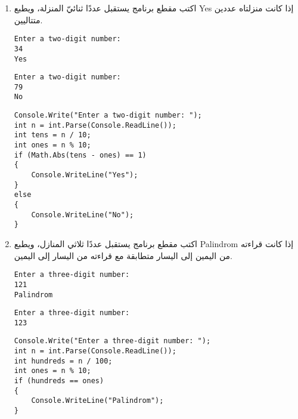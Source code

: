 ﻿\documentclass[12pt]{article}
\begin{document}
\begin{enumerate}[itemsep=3em]
\item
اكتب مقطع برنامج يستقبل عددًا ثنائيّ المنزلة، ويطبع \textenglish{Yes} إذا كانت منزلتاه عددين متتاليين.
\ifdetailed
\begin{boxExample}[1]
\begin{english}
\begin{verbatim}
Enter a two-digit number:
34
Yes
\end{verbatim}
\end{english}
\end{boxExample}
\begin{boxExample}[2]
\begin{english}
\begin{verbatim}
Enter a two-digit number:
79
No
\end{verbatim}
\end{english}
\end{boxExample}
\ifwithsols
\begin{boxSolution}
\begin{english}
\begin{verbatim}
Console.Write("Enter a two-digit number: ");
int n = int.Parse(Console.ReadLine());
int tens = n / 10;
int ones = n % 10;
if (Math.Abs(tens - ones) == 1)
{
    Console.WriteLine("Yes");
}
else
{
    Console.WriteLine("No");
}
\end{verbatim}
\end{english}
\end{boxSolution}
\fi
\clearpage
\fi

\item
اكتب مقطع برنامج يستقبل عددًا ثلاثي المنازل، ويطبع \textenglish{Palindrom} إذا كانت قراءته من اليمين إلى اليسار متطابقة مع قراءته من اليسار إلى اليمين.
\ifdetailed
\begin{boxExample}[1]
\begin{english}
\begin{verbatim}
Enter a three-digit number:
121
Palindrom
\end{verbatim}
\end{english}
\end{boxExample}
\begin{boxExample}[2]
\begin{english}
\begin{verbatim}
Enter a three-digit number:
123
\end{verbatim}
\end{english}
\end{boxExample}
\fi
\ifwithsols
\begin{boxSolution}
\begin{english}
\begin{verbatim}
Console.Write("Enter a three-digit number: ");
int n = int.Parse(Console.ReadLine());
int hundreds = n / 100;
int ones = n % 10;
if (hundreds == ones)
{
    Console.WriteLine("Palindrom");
}
\end{verbatim}
\end{english}
\end{boxSolution}
\clearpage
\fi


\end{enumerate}
\end{document}
